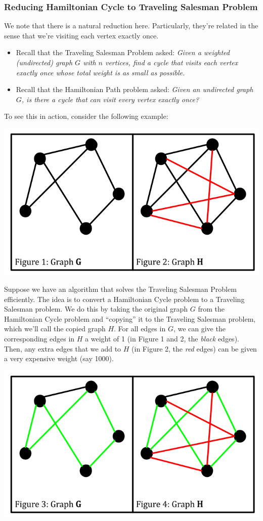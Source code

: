 \documentclass[letterpaper]{article}
\begin{document}
\subsubsection{Reducing Hamiltonian Cycle to Traveling Salesman Problem}
We note that there is a natural reduction here. Particularly, they're related in the sense that we're visiting each vertex exactly once. 
\begin{itemize}
    \item Recall that the Traveling Salesman Problem asked: \emph{Given a weighted (undirected) graph $G$ with $n$ vertices, find a cycle that visits each vertex exactly once whose total weight is as small as possible.}
    \item Recall that the Hamiltonian Path problem asked: \emph{Given an undirected graph $G$, is there a cycle that can visit every vertex exactly once?}
\end{itemize}
To see this in action, consider the following example: 
\begin{center}
    \includegraphics[scale=0.4]{../assets/ham_tsp.png}
\end{center}
Suppose we have an algorithm that solves the Traveling Salesman Problem efficiently. The idea is to convert a Hamiltonian Cycle problem to a Traveling Salesman problem. We do this by taking the original graph $G$ from the Hamiltonian Cycle problem and ``copying'' it to the Traveling Salesman problem, which we'll call the copied graph $H$. For all edges in $G$, we can give the corresponding edges in $H$ a weight of 1 (in Figure 1 and 2, the \emph{black} edges). Then, any extra edges that we add to $H$ (in Figure 2, the \emph{red} edges) can be given a very expensive weight (say 1000). 
\begin{center}
    \includegraphics[scale=0.4]{../assets/ham_tsp_2.png}
\end{center}
\end{document}
